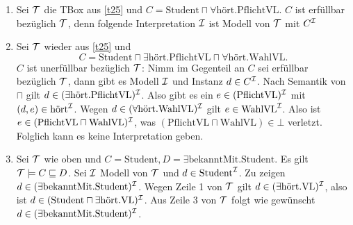 \begin{tafel}\mbox{}
    \begin{enumerate}[label=\alph*)]
    \item Sei $\mathcal{T}$ die TBox aus \autoref{t25} und $C = \text{Student} \sqcap \forall \text{hört}.\text{PflichtVL}$. $C$ ist erfüllbar bezüglich $\mathcal{T}$, denn folgende Interpretation $\mathcal{I}$ ist Modell von $\mathcal{T}$ mit $C^{\mathcal{I}}$
    \begin{center}
    \end{center}
\item Sei $\mathcal{T}$ wieder aus \autoref{t25} und
    \[C = \text{Student} \sqcap \exists \text{hört}.\text{PflichtVL} \sqcap \forall \text{hört}.\text{WahlVL}.\]
    $C$ ist unerfüllbar bezüglich $\mathcal{T}$: Nimm im Gegenteil an $C$ sei erfüllbar bezüglich $\mathcal{T}$, dann gibt es Modell $\mathcal{I}$ und Instanz $d\in C^{\mathcal{I}}$. Nach Semantik von $\sqcap$ gilt $d \in (\exists \text{hört}.\text{PflichtVL})^{\mathcal{I}}$. Also gibt es ein $e \in (\text{PflichtVL})^{\mathcal{I}}$ mit $(d, e) \in \text{hört}^{\mathcal{I}}$. Wegen $d \in (\forall \text{hört}.\text{WahlVL})^{\mathcal{I}}$ gilt $e \in \text{WahlVL}^{\mathcal{I}}$. Also ist $e \in (\text{PflichtVL} \sqcap \text{WahlVL})^{\mathcal{I}}$, was $(\text{PflichtVL} \sqcap \text{WahlVL}) \in \bot$ verletzt. Folglich kann es keine Interpretation geben.
\item Sei $\mathcal{T}$ wie oben und $C = \text{Student}, D = \exists \text{bekanntMit}.\text{Student}$. Es gilt $\mathcal{T} \models C \sqsubseteq D$. Sei $\mathcal{I}$ Modell von $\mathcal{T}$ und $d \in \text{Student}^{\mathcal{I}}$. Zu zeigen $d \in (\exists \text{bekanntMit}.\text{Student})^{\mathcal{I}}$. Wegen Zeile 1 von $\mathcal{T}$ gilt $d \in (\exists \text{hört}.\text{VL})^{\mathcal{I}}$, also ist $d \in (\text{Student} \sqcap \exists \text{hört}.\text{VL})^{\mathcal{I}}$. Aus Zeile 3 von $\mathcal{T}$ folgt wie gewünscht $d \in (\exists \text{bekanntMit}.\text{Student})^{\mathcal{I}}$.
    \end{enumerate}
\end{tafel}


